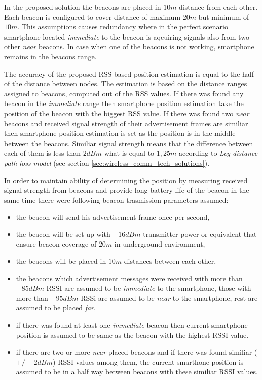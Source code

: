 \documentclass[../main.tex]{subfiles}
\begin{document}
In the proposed solution the beacons are placed in $10m$ distance from each other. Each beacon is configured to cover distance of maximum $20 m$ but minimum of $10 m$. This assumptions causes redundancy where in the perfect scenario smartphone located \textit{immediate} to the beacon is aqcuiring signals also from two other \textit{near} beacons. In case when one of the beacons is not working, smartphone remains in the beacons range.

The accuracy of the proposed RSS based position estimation is equal to the half of the distance between nodes. The estimation is based on the distance ranges assigned to beacons, computed out of the RSS values. If there was found any beacon in the \textit{immediate} range then smartphone position estimation take the position of the beacon with the biggest RSS value. If there was found two \textit{near} beacons and received signal strength of their advertisement frames are similiar then smartphone position estimation is set as the position is in the middle between the beacons. Similiar signal strength means that the difference between each of them is less than $2 dBm$ what is equal to $1,25 m$ according to \textit{Log-distance path loss model} (see section \ref{sec:wireless_comm_tech_solutions}).

In order to maintain ability of determining the position by measuring received signal strength from beacons and provide long battery life of the beacon in the same time there were following beacon trasmission parameters assumed:
\begin{itemize}
	\item the beacon will send his advertisement frame once per second,
	\item the beacon will be set up with $-16 dBm$ transmitter power or equivalent that ensure beacon coverage of $20 m$ in underground environment,
	\item the beacons will be placed in $10 m$ distances between each other,
	\item the beacons which advertisement messages were received with more than $-85 dBm$ RSSI are assumed to be \textit{immediate} to the smartphone, those with more than $-95 dBm$ RSSi are assumed to be \textit{near} to the smartphone, rest are assumed to be placed \textit{far},
	\item if there was found at least one \textit{immediate} beacon then current smartphone position is assumed to be same as the beacon with the highest RSSI value.
	\item if there are two or more \textit{near}-placed beacons and if there was found similiar ($+/- 2 dBm$) RSSI values among them, the current smarthone position is assumed to be in a half way between beacons with these similiar RSSI values.
\end{itemize}
\end{document}
